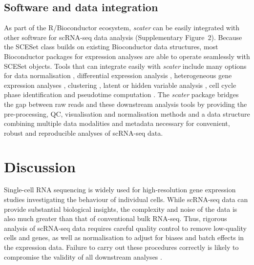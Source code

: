 \documentclass{bioinfo}
\begin{document}
\subsection{Software and data integration}\label{software-and-data-integration}

As part of the R/Bioconductor ecosystem, \emph{scater} can be easily
integrated with other software for scRNA-seq data analysis (Supplementary Figure~2). Because the
SCESet class builds on existing Bioconductor data structures, most
Bioconductor packages for expression analyses are able to operate
seamlessly with SCESet objects. Tools that can integrate easily with
\emph{scater} include many options for data normalisation
\citep{Lun2016-sk,Vallejos2015-ww,Ding2015-jv}, differential expression analysis
\citep{Vallejos2016-qy,Trapnell2014-gj,Finak2015-rd,Vu2016-sk,Kharchenko2014-rx,Korthauer2015-wg,Andrews2016-at}, heterogeneous gene expression analyses
\citep{Lun2016-sk,Vallejos2015-ww}, clustering
\citep{Kiselev2016-fu,Guo2015-wx,Fan2016-wh,Grun2015-fy}, latent or hidden
variable analysis
\citep{Leek2014-nu,Risso2014-np,Stegle2012-is,Chikina2015-lq},
cell cycle phase identification \citep{Scialdone2015-gj} and pseudotime
computation \citep{Trapnell2014-gj,Angerer2015-sw,Julia2015-jt,Campbell2016-es,Campbell2015-nj,Haghverdi2016-is}. The \emph{scater} package bridges
the gap between raw reads and these downstream analysis tools by providing the
pre-processing, QC, visualisation and normalisation methods and a data
structure combining multiple data modalities and metadata necessary for
convenient, robust and reproducible analyses of scRNA-seq data.


\section{Discussion}\label{discussion}

Single-cell RNA sequencing is widely used for high-resolution gene
expression studies investigating the behaviour of individual cells.
While scRNA-seq data can provide substantial biological insights, the
complexity and noise of the data is also much greater than that of
conventional bulk RNA-seq. Thus, rigorous analysis of scRNA-seq data
requires careful quality control to remove low-quality cells and genes,
as well as normalisation to adjust for biases and batch effects in the
expression data. Failure to carry out these procedures correctly is
likely to compromise the validity of all downstream analyses
\citep{Leek2010-nq,Hicks2015-qy,Tung2016-jy,Bacher2016-ay,Grun2015-xi}.
\end{document}
